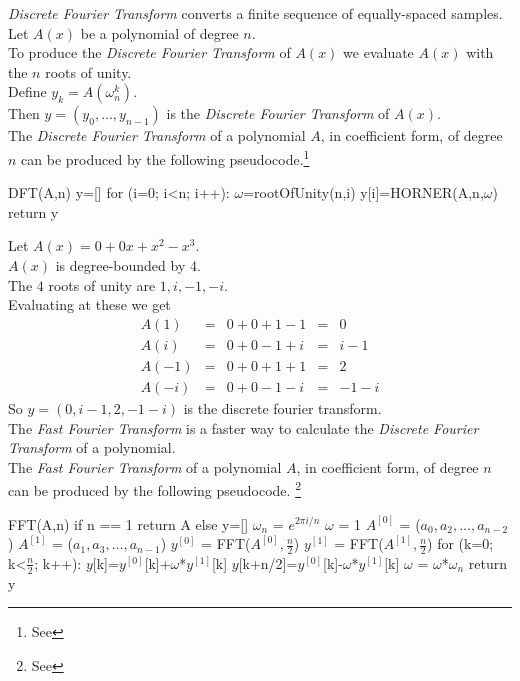 \documentclass[11pt,a4paper]{article}
\begin{document}
\newpage
{}
\textit{Discrete Fourier Transform} converts a finite sequence of equally-spaced samples.\\ 
Let $A(x)$ be a polynomial of degree $n$.\\
To produce the \textit{Discrete Fourier Transform} of $A(x)$ we evaluate $A(x)$ with the $n$ roots of unity.\\
Define $y_k=A\left(\omega_n^k\right)$.\\
Then $y=(y_0,\dots,y_{n-1})$ is the \textit{Discrete Fourier Transform} of $A(x)$.\\

The \textit{Discrete Fourier Transform} of a polynomial $A$, in coefficient form, of degree $n$ can be produced by the following pseudocode.\footnote{See {}}
\begin{code}
DFT(A,n)
y=[]
for (i=0; i<n; i++):
  $\omega$=rootOfUnity(n,i)
  y[i]=HORNER(A,n,$\omega$)
return y
\end{code}

Let $A(x)=0+0x+x^2-x^3$.\\
$A(x)$ is degree-bounded by $4$.\\
The $4$ roots of unity are ${1, i, -1, -i}$.\\
Evaluating at these we get
\[\begin{array}{rcccl}
A(1)&=&0+0+1-1&=&0\\
A(i)&=&0+0-1+i&=&i-1\\
A(-1)&=&0+0+1+1&=&2\\
A(-i)&=&0+0-1-i&=&-1-i
\end{array}\]
So $y=(0, i-1, 2, -1-i)$ is the discrete fourier transform.\\

The \textit{Fast Fourier Transform} is a faster way to calculate the \textit{Discrete Fourier Transform} of a polynomial.\\

\newpage
{}
The \textit{Fast Fourier Transform} of a polynomial $A$, in coefficient form, of degree $n$ can be produced by the following pseudocode. \footnote{See {}}
\begin{code}
FFT(A,n)
if n == 1
  return A
else
  y=[]
  $\omega_n$ = $e^{2\pi i/n}$
  $\omega$ = 1
  $A^{[0]}$ = ($a_0, a_2, \dots, a_{n-2}$)
  $A^{[1]}$ = ($a_1, a_3, \dots, a_{n-1}$)
  $y^{[0]}$ = FFT($A^{[0]}, \frac{n}{2}$)
  $y^{[1]}$ = FFT($A^{[1]}, \frac{n}{2}$)
  for (k=0; k<$\frac{n}{2}$; k++):
    $y$[k]=$y^{[0]}$[k]+$\omega$*$y^{[1]}$[k]
    $y$[k+n/2]=$y^{[0]}$[k]-$\omega$*$y^{[1]}$[k]
    $\omega$ = $\omega$*$\omega_n$
  return y
\end{code}
\end{document}
